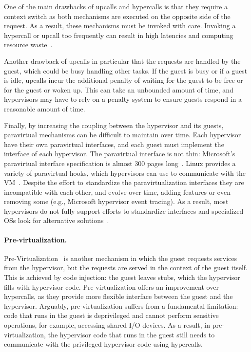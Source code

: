 \documentclass[11pt]{article}
\begin{document}
One of the main drawbacks of upcalls and hypercalls is that they
require a context switch as both mechanisms are executed on the opposite
side of the request. As a result, these
mechanisms must be invoked with care. Invoking a hypercall or upcall
too frequently can result in high latencies and computing resource 
waste~\cite{amit11}. 

Another drawback of upcalls in particular that the requests are
handled by the guest, which could be busy handling other tasks. If the
guest is busy or if a guest is idle, upcalls incur
the additional penalty of waiting for the guest to be free or
for the guest or woken up. This can take an unbounded amount of time,
and hypervisors may have to rely on a penalty system to ensure guests
respond in a reasonable amount of time.

Finally, by increasing the coupling between the hypervisor and its guests,
paravirtual mechanisms can be difficult to maintain over time. Each hypervisor
have their own paravirtual interfaces, and each guest must implement the interface
of each hypervisor. The paravirtual interface is not thin: Microsoft's paravirtual interface specification
 is almost 300 pages long~\cite{specifications17microsoft}. Linux provides a variety of paravirtual hooks, 
 which hypervisors can use to communicate with the VM~\cite{xenparavirtops}. 
 Despite the effort to standardize the paravirtualization interfaces they are incompatible with each other, and
 evolve over time, adding features or even removing some (e.g., Microsoft hypervisor event tracing). As a result, most hypervisors do not
 fully support efforts to standardize interfaces and specialized OSs look for alternative solutions~\cite{madhavapeddy2013unikernels,porter11rethinking}.

 \paragraph{Pre-virtualization.} Pre-Virtualization~\cite{levasseur2005pre} is another mechanism 
 in which the guest requests services from the hypervisor, but the requests are served in the 
 context of the guest itself. This is achieved by code injection: the guest leaves stubs, which the 
 hypervisor fills with hypervisor code. Pre-virtualization offers an improvement over hypercalls, 
 as they provide more flexible interface between the guest and the hypervisor. Arguably, pre-virtualization suffers
 from a fundamental limitation: code that runs in the guest is deprivileged and cannot perform
 sensitive operations, for example, accessing shared I/O devices. As a result, in pre-virtualization, 
 the hypervisor code that runs in the guest still needs to communicate with
 the privileged hypervisor code using hypercalls.
\end{document}

